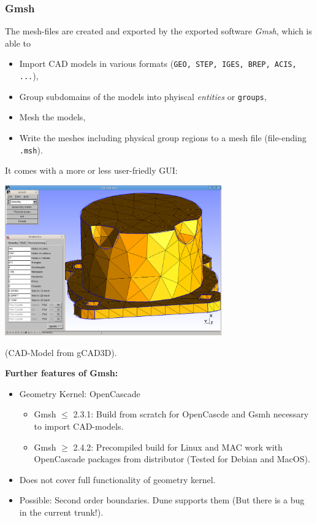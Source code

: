 \begin{frame}
  \frametitle{Gmsh}
  The mesh-files are created and exported by the exported software \emph{Gmsh},
  which is able to
  \begin{itemize}
    \item Import CAD models in various formats
      (\lstinline!GEO, STEP, IGES, BREP, ACIS, ...!),
    \item Group subdomains of the models into phyiscal \emph{entities} or
      \lstinline{groups},
    \item Mesh the models,
    \item Write the meshes including physical group regions to a mesh file
      (file-ending \lstinline!.msh!).
  \end{itemize}
  It comes with a more or less user-friedly GUI:
  \begin{center}
    \includegraphics[width=0.7\textwidth]{./EPS/gcad3d_deckel}
  \end{center}
  {\tiny (CAD-Model from gCAD3D).}

  \textbf{Further features of Gmsh:}
  \begin{itemize}
    \item Geometry Kernel: OpenCascade
      \begin{itemize}
        \item Gmsh $\leq$ 2.3.1: Build from scratch for OpenCascde and Gsmh
          necessary to import CAD-models.
        \item Gmsh $\geq$ 2.4.2: Precompiled build for Linux and MAC work with
          OpenCascade packages from distributor (Tested for Debian and MacOS).
      \end{itemize}
    \item Does not cover full functionality of geometry kernel.
    \item Possible: Second order boundaries. Dune supports them (But there is a
      bug in the current trunk!).
  \end{itemize}
\end{frame}

